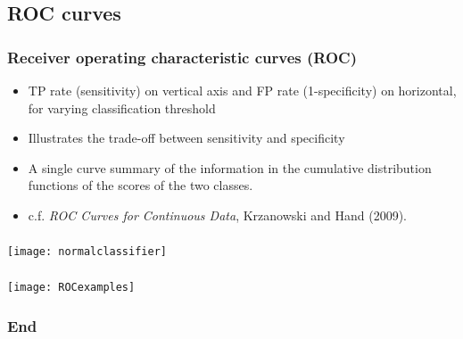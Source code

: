 \documentclass[t]{beamer}
\begin{document}
\subsection{ROC curves}

\begin{frame}
\frametitle{Receiver operating characteristic curves (ROC)}
\begin{itemize}
\item TP rate (sensitivity) on vertical axis and FP rate (1-specificity) on horizontal, for varying classification threshold
\item Illustrates the \alert{trade-off} between sensitivity and specificity 
\item A single curve summary of the information in the cumulative distribution functions of the scores of the two classes.
\item c.f. {\it ROC Curves for Continuous Data}, Krzanowski and Hand (2009).
\end{itemize}
\end{frame} 

\begin{frame}
\frametitle{}
 \texttt{[image: normalclassifier]}
\end{frame} 


\begin{frame}
\frametitle{}
 \texttt{[image: ROCexamples]}
\end{frame} 

\begin{frame}
\frametitle{End}
\end{frame} 
\end{document}
